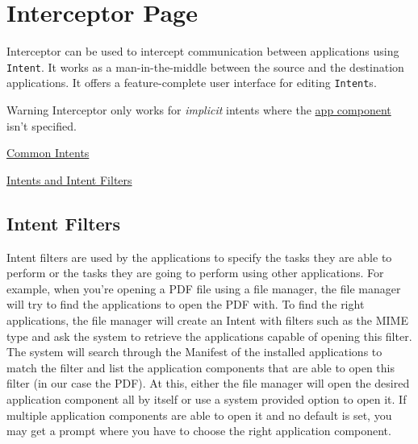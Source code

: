 \section{Interceptor Page}\label{sec:interceptor-page} %
Interceptor can be used to intercept communication between applications using \texttt{Intent}.
It works as a man-in-the-middle between the source and the destination applications.
It offers a feature-complete user interface for editing \texttt{Intent}s.

\begin{warning}{Warning}
    Interceptor only works for \textit{implicit} intents where the \hyperref[subsec:faq:what-are-app-components]{app component} isn't specified.
\end{warning}

\begin{amseealso}
    \item \href{https://developer.android.com/guide/components/intents-common}{Common Intents}
    \item \href{https://developer.android.com/guide/components/intents-filters}{Intents and Intent Filters}
\end{amseealso}

\subsection{Intent Filters}\label{subsec:intent-filters} %
Intent filters are used by the applications to specify the tasks they are able to perform or the tasks they are going to perform using other applications.
For example, when you're opening a PDF file using a file manager, the file manager will try to find the applications to open the PDF with.
To find the right applications, the file manager will create an Intent with filters such as the MIME type and ask the system to retrieve the applications capable of opening this filter.
The system will search through the Manifest of the installed applications to match the filter and list the application components that are able to open this filter (in our case the PDF).
At this, either the file manager will open the desired application component all by itself or use a system provided option to open it.
If multiple application components are able to open it and no default is set, you may get a prompt where you have to choose the right application component.

